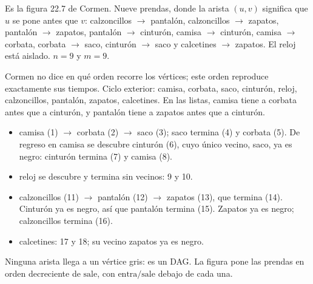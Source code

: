 \documentclass[11pt,letterpaper]{article}
\begin{document}
\begin{ejemplo}
  \label{ej:ropa-dfs}
  Es la figura 22.7 de Cormen. Nueve prendas, donde la arista $(u, v)$
  significa que $u$ se pone antes que $v$: calzoncillos $\to$
  pantalón, calzoncillos $\to$ zapatos, pantalón $\to$ zapatos,
  pantalón $\to$ cinturón, camisa $\to$ cinturón, camisa $\to$ corbata,
  corbata $\to$ saco, cinturón $\to$ saco y calcetines $\to$ zapatos.
  El reloj está aislado. $n = 9$ y $m = 9$.

  Cormen no dice en qué orden recorre los vértices; este orden
  reproduce exactamente sus tiempos. Ciclo exterior: camisa, corbata,
  saco, cinturón, reloj, calzoncillos, pantalón, zapatos, calcetines.
  En las listas, camisa tiene a corbata antes que a cinturón, y
  pantalón tiene a zapatos antes que a cinturón.
  \begin{itemize}[itemsep=0.1em]
    \item camisa (1) $\to$ corbata (2) $\to$ saco (3); saco termina (4)
          y corbata (5). De regreso en camisa se descubre cinturón (6),
          cuyo único vecino, saco, ya es negro: cinturón termina (7) y
          camisa (8).
    \item reloj se descubre y termina sin vecinos: 9 y 10.
    \item calzoncillos (11) $\to$ pantalón (12) $\to$ zapatos (13), que
          termina (14). Cinturón ya es negro, así que pantalón termina
          (15). Zapatos ya es negro; calzoncillos termina (16).
    \item calcetines: 17 y 18; su vecino zapatos ya es negro.
  \end{itemize}
  Ninguna arista llega a un vértice gris: es un DAG. La figura pone las
  prendas en orden decreciente de $\text{sale}$, con
  $\text{entra}/\text{sale}$ debajo de cada una.
  \begin{center}
\end{center}
\end{ejemplo}
\end{document}
